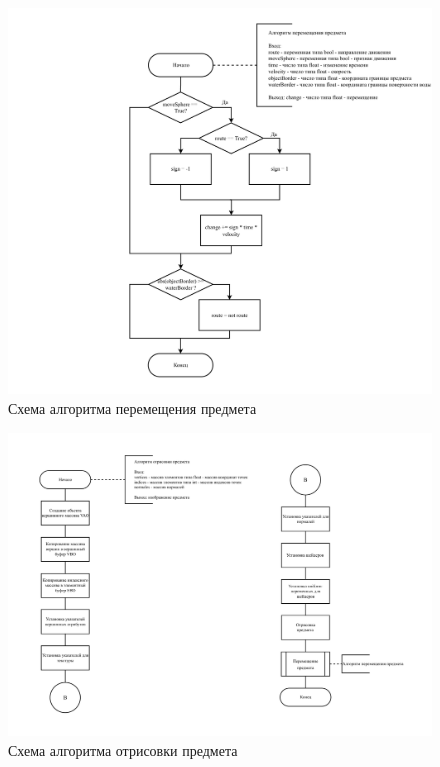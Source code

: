 \begin{figure}[H]
	\begin{center}
		\includegraphics[scale=0.6]{img/move-object.pdf}
	\end{center}
	\captionsetup{justification=centering}
	\caption{Схема алгоритма перемещения предмета}
	\label{img:move-object}
\end{figure}

\begin{figure}[H]
	\begin{center}
		\includegraphics[scale=0.5]{img/draw-object.pdf}
	\end{center}
	\captionsetup{justification=centering}
	\caption{Схема алгоритма отрисовки предмета}
	\label{img:draw-object}
\end{figure}

